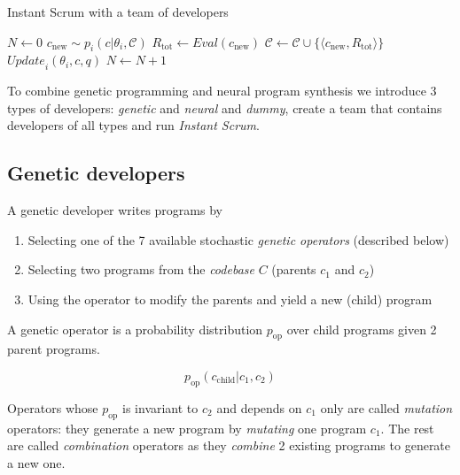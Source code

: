 \begin{algorithm}[H]
\begin{algorithmic}[1]
\caption{Instant Scrum with a team of developers}
\label{alg:instantscrum}
\State $N \gets 0$
\State $c_\text{new}\sim p_i(c | \theta_i, \mathcal{C})$ 
\State $R_\text{tot} \gets \mathit{Eval}(c_\text{new})$
\State $\mathcal{C} \gets \mathcal{C} \cup \{\langle c_\text{new}, R_\text{tot} \rangle\}$
\State $\mathit{Update}_i(\theta_i, c, q)$
\State $N \gets N+1$
\EndFor
\EndWhile
\EndProcedure
\end{algorithmic}
\end{algorithm}

To combine genetic programming and neural program synthesis we introduce 3 types of developers: \emph{genetic} and \emph{neural} and \emph{dummy}, create a team that contains developers of all types and run \emph{Instant Scrum}.

\newpage \subsection{Genetic developers}
\label{sec:genetic}

A genetic developer writes programs by
\begin{enumerate}
    \item Selecting one of the 7 available stochastic \emph{genetic operators} (described below)
    \item Selecting two programs from the \emph{codebase} $C$ (parents $c_1$ and $c_2$) 
    \item Using the operator to modify the parents and yield a new (child) program
\end{enumerate}

A genetic operator is a probability distribution $p_\text{op}$ over child programs given 2 parent programs. 

\begin{equation}
    p_\text{op}(c_\text{child}|c_1,c_2)
\end{equation}

Operators whose $p_\text{op}$ is invariant to $c_2$ and depends on $c_1$ only are called \emph{mutation} operators: they generate a new program by \emph{mutating} one program $c_1$.
The rest are called \emph{combination} operators as they \emph{combine} 2 existing programs to generate a new one.



